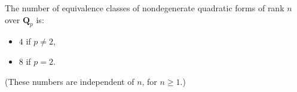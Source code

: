 The number of equivalence classes of nondegenerate quadratic forms of rank $n$ over $\mathbf{Q}_p$ is:
\begin{itemize}
\item $4$ if $p \neq 2$,
\item $8$ if $p = 2$.
\end{itemize}
(These numbers are independent of $n$, for $n \geq 1$.)
